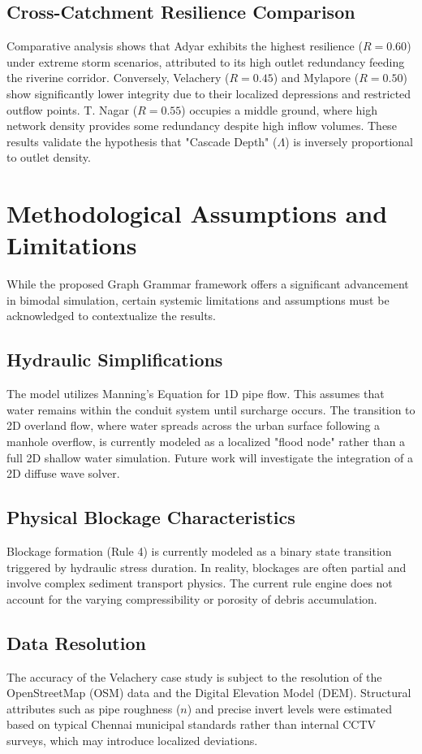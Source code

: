 \documentclass[conference]{IEEEtran}
\begin{document}
\subsection{Cross-Catchment Resilience Comparison}
Comparative analysis shows that Adyar exhibits the highest resilience ($R=0.60$) under extreme storm scenarios, attributed to its high outlet redundancy feeding the riverine corridor. Conversely, Velachery ($R=0.45$) and Mylapore ($R=0.50$) show significantly lower integrity due to their localized depressions and restricted outflow points. T. Nagar ($R=0.55$) occupies a middle ground, where high network density provides some redundancy despite high inflow volumes. These results validate the hypothesis that "Cascade Depth" ($\Lambda$) is inversely proportional to outlet density.

\section{Methodological Assumptions and Limitations}
While the proposed Graph Grammar framework offers a significant advancement in bimodal simulation, certain systemic limitations and assumptions must be acknowledged to contextualize the results.

\subsection{Hydraulic Simplifications}
The model utilizes Manning's Equation for 1D pipe flow. This assumes that water remains within the conduit system until surcharge occurs. The transition to 2D overland flow, where water spreads across the urban surface following a manhole overflow, is currently modeled as a localized "flood node" rather than a full 2D shallow water simulation. Future work will investigate the integration of a 2D diffuse wave solver.

\subsection{Physical Blockage Characteristics}
Blockage formation (Rule 4) is currently modeled as a binary state transition triggered by hydraulic stress duration. In reality, blockages are often partial and involve complex sediment transport physics. The current rule engine does not account for the varying compressibility or porosity of debris accumulation.

\subsection{Data Resolution}
The accuracy of the Velachery case study is subject to the resolution of the OpenStreetMap (OSM) data and the Digital Elevation Model (DEM). Structural attributes such as pipe roughness ($n$) and precise invert levels were estimated based on typical Chennai municipal standards rather than internal CCTV surveys, which may introduce localized deviations.
\end{document}

